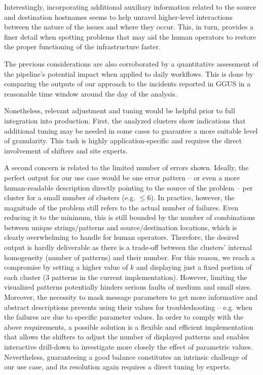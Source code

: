 
Interestingly, incorporating additional auxiliary information related to the source and destination hostnames seems to help unravel higher-level interactions between the nature of the issues and where they occur.
This, in turn, provides a finer detail when spotting problems that may aid the human operators to restore the proper functioning of the infrastructure faster.

The previous considerations are also corroborated by a quantitative assessment of the pipeline's potential impact when applied to daily workflows. This is done by comparing the outputs of our approach to the incidents reported in GGUS in a reasonable time window around the day of the analysis.

Nonetheless, relevant adjustment and tuning would be helpful prior to full integration into production.
First, the analyzed clusters show indications that additional tuning may be needed in some cases to guarantee a more suitable level of granularity.
This task is highly application-specific and requires the direct involvement of shifters and site experts.

A second concern is related to the limited number of errors shown.
Ideally, the perfect output for our use case would be one error pattern
-- or even a more human-readable description directly pointing to the source of the problem -- 
per cluster for a small number of clusters (e.g. $\leq6$).
In practice, however, the magnitude of the problem still refers to the actual number of failures. Even reducing it to the minimum, this is still bounded by the number of combinations between unique strings/patterns and source/destination locations, which is clearly overwhelming to handle for human operators.
Therefore, the desired output is hardly deliverable as there is a trade-off between the clusters' internal homogeneity (number of patterns) and their number.
For this reason, we reach a compromise by setting a higher value of $k$ and displaying just a fixed portion of each cluster (3 patterns in the current implementation).
However, limiting the visualized patterns potentially hinders serious faults of medium and small sizes.
Moreover, the necessity to mask message parameters to get more informative and abstract descriptions prevents using their values for troubleshooting -- e.g. when the failures are due to specific parameter values.
In order to comply with the above requirements, a possible solution is a flexible and efficient implementation that allows the shifters to adjust the number of displayed patterns and enables interactive drill-down to investigate more closely the effect of parametric values.
Nevertheless, guaranteeing a good balance constitutes an intrinsic challenge of our use case, and its resolution again requires a direct tuning by experts.

